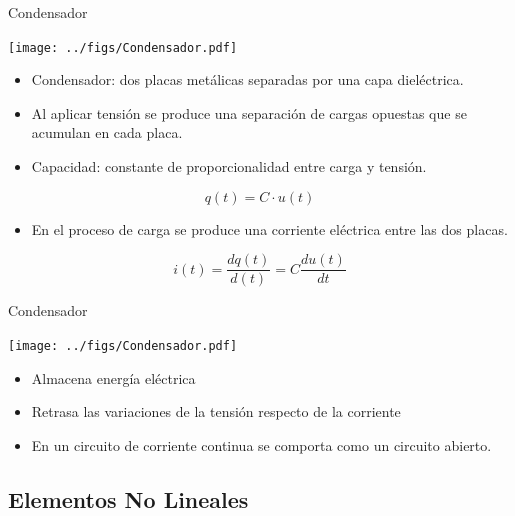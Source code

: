 \documentclass[xcolor={usenames,svgnames,dvipsnames}]{beamer}
\begin{document}
\begin{frame}[label={sec:org5c56b6c}]{Condensador}
\begin{center}
\texttt{[image: ../figs/Condensador.pdf]}
\end{center}

\begin{itemize}
\item \alert{Condensador}: dos placas metálicas separadas por una capa dieléctrica.

\item Al aplicar tensión se produce una \alert{separación de cargas opuestas que
se acumulan en cada placa}.

\item \alert{Capacidad}: constante de proporcionalidad entre carga y tensión.
\end{itemize}
\[
q(t) = C \cdot u(t)
\]

\begin{itemize}
\item En el proceso de carga se produce una corriente eléctrica entre las
dos placas.
\end{itemize}
\[
i(t)=\frac{dq(t)}{d(t)}=C\frac{du(t)}{dt}
\]
\end{frame}


\begin{frame}[label={sec:org2dfdc5a}]{Condensador}
\begin{center}
\texttt{[image: ../figs/Condensador.pdf]}
\end{center}

\begin{itemize}
\item Almacena \alert{energía eléctrica}

\item \alert{Retrasa las variaciones de la tensión respecto de la corriente}

\item En un circuito de corriente continua se comporta como un circuito
abierto.
\end{itemize}
\end{frame}

\subsection{Elementos No Lineales}
\label{sec:org6279a4e}
\end{document}
